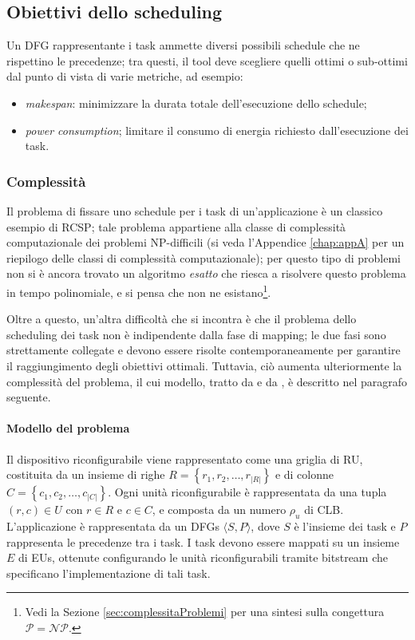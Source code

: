 \subsection{Obiettivi dello scheduling}
Un \ac{DFG} rappresentante i task ammette diversi possibili schedule che ne rispettino le 
precedenze; tra questi, il tool deve scegliere quelli ottimi o sub-ottimi dal punto di 
vista di varie metriche, ad esempio:
\begin{itemize}
 \item \emph{makespan}: minimizzare la durata totale dell'esecuzione dello schedule;
 \item \emph{power consumption}; limitare il consumo di energia richiesto 
dall'esecuzione dei task.
\end{itemize}


\subsubsection{Complessità}
Il problema di fissare uno schedule per i task di un'applicazione è un classico esempio 
di \ac{RCSP}; tale problema appartiene alla classe di complessità computazionale dei 
problemi NP-difficili (si veda l'Appendice \ref{chap:appA} per un riepilogo delle classi 
di complessità computazionale); per questo tipo di problemi non si è ancora trovato un 
algoritmo \emph{esatto} che riesca a risolvere questo problema in tempo 
polinomiale, e si pensa che non ne esistano\footnote{Vedi la Sezione 
\ref{sec:complessitaProblemi} per una sintesi sulla congettura $\mathcal{P} = 
\mathcal{NP}$.}.

Oltre a questo, un'altra difficoltà che si incontra è che il problema dello scheduling 
dei task non è indipendente dalla fase di mapping; le due fasi sono strettamente 
collegate e devono essere risolte contemporaneamente per garantire il raggiungimento 
degli obiettivi ottimali. Tuttavia, ciò aumenta ulteriormente la complessità del 
problema, il cui modello, tratto da \cite{ModelloRedaelli} e da 
\cite{ReconfigurableSystemDesignVerification}, è descritto nel paragrafo seguente.


\paragraph{Modello del problema}
Il dispositivo riconfigurabile viene rappresentato come una griglia di \ac{RU}, 
costituita da un insieme di righe $R=\left\{r_1, r_2, \dots, r_{\vert R \vert}\right\}$ e 
di colonne $C=\left\{c_1, c_2, \dots, c_{\vert C \vert}\right\}$. Ogni unità 
riconfigurabile è rappresentata da una tupla $(r,c) \in U$ con $r \in R$ e $c \in C$, e 
composta da un numero $\rho_{u}$ di \ac{CLB}. L'applicazione è rappresentata da un 
\acp{DFG} $\langle S, P \rangle$, dove $S$ è l'insieme dei task e $P$ rappresenta le 
precedenze tra i task. I task devono essere mappati su un insieme $E$ di \acp{EU}, 
ottenute configurando le unità riconfigurabili tramite bitstream che specificano 
l'implementazione di tali task.

